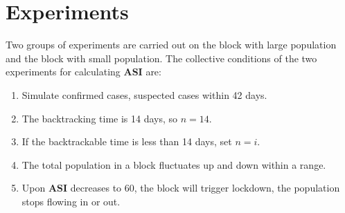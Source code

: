 \documentclass[conference]{IEEEtran}
\begin{document}
\section{Experiments}
Two groups of experiments are carried out on the block with large population and the block with small population.
The collective conditions of the two experiments for calculating \textbf{ASI} are:
\begin{enumerate}
    \item Simulate confirmed cases, suspected cases within 42 days.
    \item The backtracking time is 14 days, so $n=14$.
    \item If the backtrackable time is less than 14 days, set $n=i$.
    \item The total population in a block fluctuates up and down within a range.
    \item Upon \textbf{ASI} decreases to 60, the block will trigger lockdown, the population stops flowing in or out.
\end{enumerate}
\end{document}

